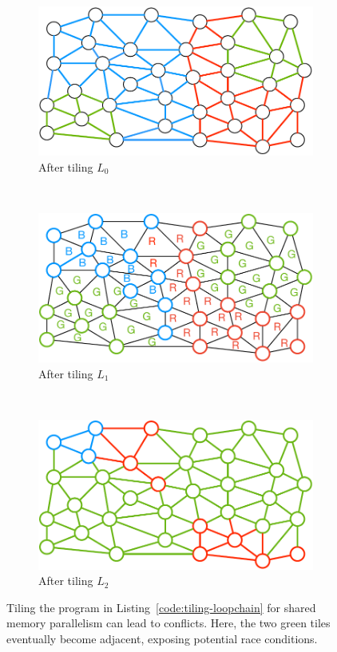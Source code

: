 \begin{figure}[h]
\centering
\begin{subfigure}[b]{0.33\textwidth}
\includegraphics[width=\textwidth]{sparsetiling/figures/loop_0_conflicts.pdf}
\caption{After tiling $L_0$}
\label{fig:st-conflicts-a}
\end{subfigure}%
~ 
\begin{subfigure}[b]{0.33\textwidth}
\centering
\includegraphics[width=\textwidth]{sparsetiling/figures/loop_1_conflicts.pdf}
\caption{After tiling $L_1$}
\label{fig:st-conflicts-b}
\end{subfigure}%
~
\begin{subfigure}[b]{0.34\textwidth}
\centering
\includegraphics[width=\textwidth]{sparsetiling/figures/loop_2_conflicts.pdf}
\caption{After tiling $L_2$}
\label{fig:st-conflicts-c}
\end{subfigure}%

\caption{Tiling the program in Listing~\ref{code:tiling-loopchain} for shared memory parallelism can lead to conflicts. Here, the two green tiles eventually become adjacent, exposing potential race conditions.}
\label{fig:st-conflicts}
\end{figure}


